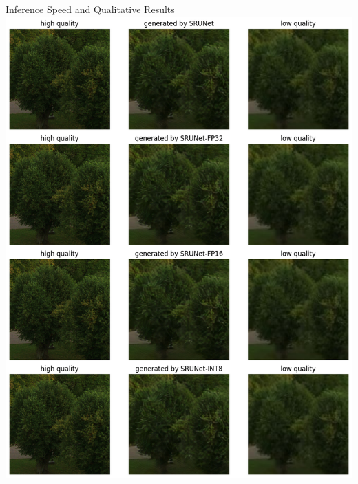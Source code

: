 \documentclass{beamer}
\begin{document}
\begin{frame}{Inference Speed and Qualitative Results}
\includegraphics[width=\textwidth]{../thesis/static/03_srunet_qualitative_results.png}
\end{frame}

\end{document}
